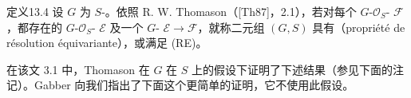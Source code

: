 \begin{SGAresult}{定义}{13.4}
设 $G$ 为 $S$-。依照 R. W. Thomason（[Th87]，2.1），若对每个 $G$-$\mathcal O_S$- $\mathcal F$，都存在的 $G$-$\mathcal O_S$- $\mathcal E$ 及一个 $G$- $\mathcal E\to\mathcal F$，就称二元组 $(G,S)$ 具有（propriété de résolution équivariante），或满足 (RE)。
\end{SGAresult}

在该文 3.1 中，Thomason 在 $G$ 在 $S$ 上的假设下证明了下述结果（参见下面的注记）。Gabber 向我们指出了下面这个更简单的证明，它不使用此假设。

